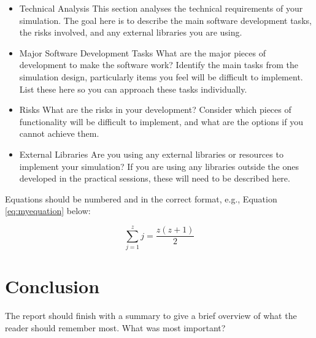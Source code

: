 \documentclass[conference]{acmsiggraph}
\begin{document}
\begin{itemize}
\item {Technical Analysis} This section analyses the technical requirements of your simulation.  The goal here is to describe the main software development tasks, the risks involved, and any external libraries you are using.
\item {Major Software Development Tasks} What are the major pieces of development to make the software work?  Identify the main tasks from the simulation design, particularly items you feel will be difficult to implement.  List these here so you can approach these tasks individually.
\item {Risks} What are the risks in your development?  Consider which pieces of functionality will be difficult to implement, and what are the options if you cannot achieve them.
\item {External Libraries} Are you using any external libraries or resources to implement your simulation?  If you are using any libraries outside the ones developed in the practical sessions, these will need to be described here.
\end{itemize}


Equations should be numbered and in the correct format, e.g., Equation \ref{eq:myequation} below:

\begin{equation} \label{eq:myequation}
 \sum_{j=1}^{z} j = \frac{z(z+1)}{2}
\end{equation}


\section{Conclusion}
The report should finish with a summary to give a brief overview of what the reader should remember most.  What was most important?






\end{document}
